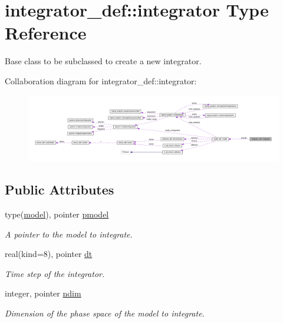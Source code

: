 \hypertarget{structintegrator__def_1_1integrator}{}\section{integrator\+\_\+def\+:\+:integrator Type Reference}
\label{structintegrator__def_1_1integrator}


Base class to be subclassed to create a new integrator.  




Collaboration diagram for integrator\+\_\+def\+:\+:integrator\+:\nopagebreak
\begin{figure}[H]
\begin{center}
\leavevmode
\includegraphics[width=350pt]{structintegrator__def_1_1integrator__coll__graph}
\end{center}
\end{figure}
\subsection*{Public Attributes}
\begin{DoxyCompactItemize}
\item 
\mbox{\label{structintegrator__def_1_1integrator_a1d261286cba5b917c64b348f5b903e64}} 
type(\hyperlink{structmodel__def_1_1model}{model}), pointer \hyperlink{structintegrator__def_1_1integrator_a1d261286cba5b917c64b348f5b903e64}{pmodel}
\begin{DoxyCompactList}\small\item\em A pointer to the model to integrate. \end{DoxyCompactList}\item 
\mbox{\label{structintegrator__def_1_1integrator_a086de7ff5ed4454ad5804312970b516c}} 
real(kind=8), pointer \hyperlink{structintegrator__def_1_1integrator_a086de7ff5ed4454ad5804312970b516c}{dt}
\begin{DoxyCompactList}\small\item\em Time step of the integrator. \end{DoxyCompactList}\item 
\mbox{\label{structintegrator__def_1_1integrator_a3e374d290b3754d2079de91068314f2e}} 
integer, pointer \hyperlink{structintegrator__def_1_1integrator_a3e374d290b3754d2079de91068314f2e}{ndim}
\begin{DoxyCompactList}\small\item\em Dimension of the phase space of the model to integrate. \end{DoxyCompactList}\end{DoxyCompactItemize}


